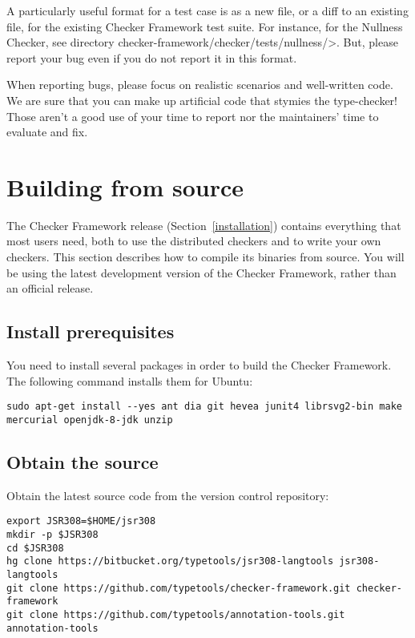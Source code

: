 A particularly useful format for a test case is as a new file, or a diff to
an existing file, for the existing Checker Framework test suite.  For
instance, for the Nullness
Checker, see directory \<checker-framework/checker/tests/nullness/>.
But, please report your bug even if you do not report it in this format.

When reporting bugs, please focus on realistic scenarios and well-written
code.  We are sure that you can make up artificial code that stymies the
type-checker!  Those aren't a good use of your time to report nor the
maintainers' time to evaluate and fix.


\section{Building from source\label{build-source}}

The Checker Framework release (Section~\ref{installation}) contains
everything that most users need, both to use the distributed checkers and
to write your own checkers.  This section describes how to compile its
binaries from source.  You will be using the latest development version of
the Checker Framework, rather than an official release.



\subsection{Install prerequisites\label{building-prerequisites}}

You need to install several packages in order to build the Checker
Framework.  The following command installs them for Ubuntu:

\begin{Verbatim}
sudo apt-get install --yes ant dia git hevea junit4 librsvg2-bin make mercurial openjdk-8-jdk unzip
\end{Verbatim}


\subsection{Obtain the source\label{building-obtain-source}}

Obtain the latest source code from the version control repository:

\begin{Verbatim}
export JSR308=$HOME/jsr308
mkdir -p $JSR308
cd $JSR308
hg clone https://bitbucket.org/typetools/jsr308-langtools jsr308-langtools
git clone https://github.com/typetools/checker-framework.git checker-framework
git clone https://github.com/typetools/annotation-tools.git annotation-tools
\end{Verbatim}

